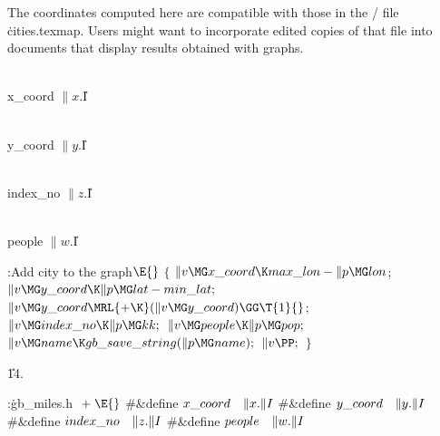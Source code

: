 The coordinates computed here are compatible with those in the \TEX/ file
\.{cities.texmap}. Users might want to incorporate edited copies of that file
into documents that display results obtained with  graphs.

\Y\B\4\D\\{x\_coord}\5
$\|x.{}$\|I\par
\B\4\D\\{y\_coord}\5
$\|y.{}$\|I\par
\B\4\D\\{index\_no}\5
$\|z.{}$\|I\par
\B\4\D\\{people}\5
$\|w.{}$\|I\par
\Y\B\4:Add city  to the graph\X${}\E{}$\6
${}\{{}$\1\6
${}\|v\MG\\{x\_coord}\K\\{max\_lon}-\|p\MG\\{lon}{}$;\6
${}\|v\MG\\{y\_coord}\K\|p\MG\\{lat}-\\{min\_lat};{}$\6
${}\|v\MG\\{y\_coord}\MRL{+{\K}}(\|v\MG\\{y\_coord})\GG\T{1}{}$;\6
${}\|v\MG\\{index\_no}\K\|p\MG\\{kk};{}$\6
${}\|v\MG\\{people}\K\|p\MG\\{pop};{}$\6
${}\|v\MG\\{name}\K\\{gb\_save\_string}(\|p\MG\\{name});{}$\6
${}\|v\PP;{}$\6
\4${}\}{}$\2\par
\U14.\fi

\B{}:\.{gb\_miles.h }\X${}\mathrel+\E{}$\6
\8\#\&{define} ${}\\{x\_coord}\hbox{\quad}\|x.\|I{}$\6
\8\#\&{define} ${}\\{y\_coord}\hbox{\quad}\|y.\|I{}$\6
\8\#\&{define} ${}\\{index\_no}\hbox{\quad}\|z.\|I{}$\6
\8\#\&{define} ${}\\{people}\hbox{\quad}\|w.\|I{}$\par
\fi


